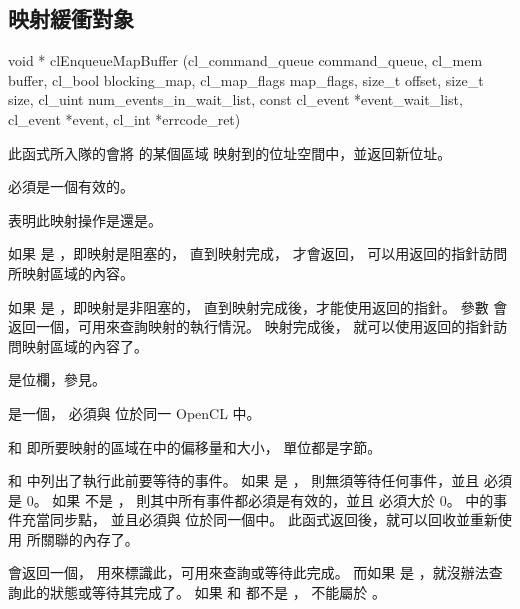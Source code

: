 \subsection{映射緩衝對象}


\startCLFUNC
void * clEnqueueMapBuffer (cl_command_queue command_queue,
			cl_mem buffer,
			cl_bool blocking_map,
			cl_map_flags map_flags,
			size_t offset,
			size_t size,
			cl_uint num_events_in_wait_list,
			const cl_event *event_wait_list,
			cl_event *event,
			cl_int *errcode_ret)
\stopCLFUNC

此函式所入隊的會將  的某個區域
映射到的位址空間中，並返回新位址。

 必須是一個有效的。

 表明此映射操作是{}還是{}。

如果  是 ，即映射是阻塞的，
直到映射完成，  才會返回，
可以用返回的指針訪問所映射區域的內容。

如果  是 ，即映射是非阻塞的，
直到映射完成後，才能使用返回的指針。
參數  會返回一個，可用來查詢映射的執行情況。
映射完成後，
就可以使用返回的指針訪問映射區域的內容了。

 是位欄，參見。

 是一個，
必須與  位於同一 OpenCL 中。

 和  即所要映射的區域在中的偏移量和大小，
單位都是字節。

 和 
中列出了執行此前要等待的事件。
如果  是 ，
則無須等待任何事件，並且  必須是 0。
如果  不是 ，
則其中所有事件都必須是有效的，並且  必須大於 0。
 中的事件充當同步點，
並且必須與  位於同一個中。
此函式返回後，就可以回收並重新使用  所關聯的內存了。

 會返回一個，
用來標識此，可用來查詢或等待此完成。
而如果  是 ，就沒辦法查詢此的狀態或等待其完成了。
如果  和  都不是 ，
 不能屬於 。

